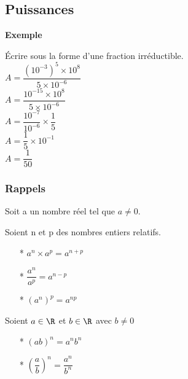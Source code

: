 
\newpage

\subsection{Puissances}

\textbf{Exemple }

Écrire sous la forme d'une fraction irréductible. \\

$ A = \dfrac{\left(10^{-3}\right)^5 \times 10^8}{5 \times 10^{-6}} $ \\

$ A = \dfrac{10^{-15} \times 10^8}{5	\times10^{-6}} $ \\

$ A = \dfrac{10^{-7}}{10^{-6}} \times \dfrac{1}{5} $ \\

$ A = \dfrac{1}{5} \times 10^{-1} $ \\

$ A = \dfrac{1}{50} $ \\

\subsubsection{Rappels}



Soit a un nombre réel tel que $ a \neq 0 $. 

Soient n et p des nombres entiers relatifs. \\

\begin{itemize}

\item[*] $ a^n \times a^p = a^{n+p} $ \\

\item[*] $ \dfrac{a^n}{a^p} = a^{n-p} $ \\

\item[*] $ \left(a^n\right)^p = a^{np} $ \\

\end{itemize}

Soient $ a \in \R $ et $ b \in \R $ avec $ b \neq 0 $ \\

\begin{itemize}

\item[*] $ \left(ab\right)^n = a^nb^n $ \\

\item[*] $ \left(\dfrac{a}{b}\right)^n = \dfrac{a^n}{b^n} $ \\

\end{itemize}

